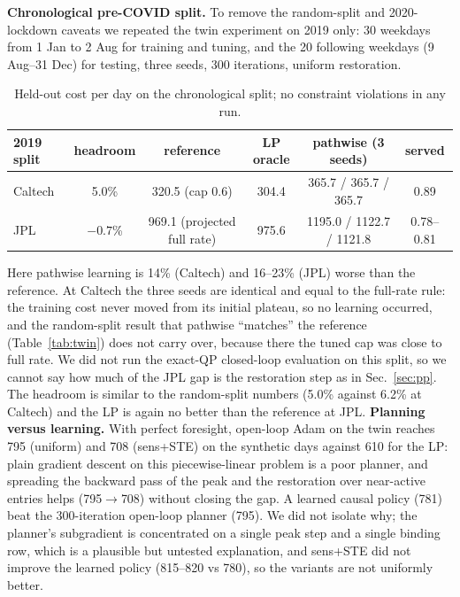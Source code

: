 \documentclass[10pt]{article}
\begin{document}
\textbf{Chronological pre-COVID split.} To remove the random-split and 2020-lockdown caveats we repeated the twin experiment on 2019 only: 30 weekdays from 1 Jan to 2 Aug for training and tuning, and the 20 following weekdays (9 Aug--31 Dec) for testing, three seeds, 300 iterations, uniform restoration.
\begin{table}[h]\centering\small\begin{tabular}{lccccc}
2019 split & headroom & reference & LP oracle & pathwise (3 seeds) & served\\\hline
Caltech & 5.0\% & 320.5 (cap 0.6) & 304.4 & 365.7 / 365.7 / 365.7 & 0.89\\
JPL & $-0.7$\% & 969.1 (projected full rate) & 975.6 & 1195.0 / 1122.7 / 1121.8 & 0.78--0.81
\end{tabular}\caption{Held-out cost per day on the chronological split; no constraint violations in any run.}\label{tab:chrono}\end{table}
Here pathwise learning is 14\% (Caltech) and 16--23\% (JPL) worse than the reference. At Caltech the three seeds are identical and equal to the full-rate rule: the training cost never moved from its initial plateau, so no learning occurred, and the random-split result that pathwise ``matches'' the reference (Table~\ref{tab:twin}) does not carry over, because there the tuned cap was close to full rate. We did not run the exact-QP closed-loop evaluation on this split, so we cannot say how much of the JPL gap is the restoration step as in Sec.~\ref{sec:pp}. The headroom is similar to the random-split numbers (5.0\% against 6.2\% at Caltech) and the LP is again no better than the reference at JPL.
\textbf{Planning versus learning.} With perfect foresight, open-loop Adam on the twin reaches 795 (uniform) and 708 (sens+STE) on the synthetic days against 610 for the LP: plain gradient descent on this piecewise-linear problem is a poor planner, and spreading the backward pass of the peak and the restoration over near-active entries helps (795$\to$708) without closing the gap. A learned causal policy (781) beat the 300-iteration open-loop planner (795). We did not isolate why; the planner's subgradient is concentrated on a single peak step and a single binding row, which is a plausible but untested explanation, and sens+STE did not improve the learned policy (815--820 vs 780), so the variants are not uniformly better.
\end{document}
